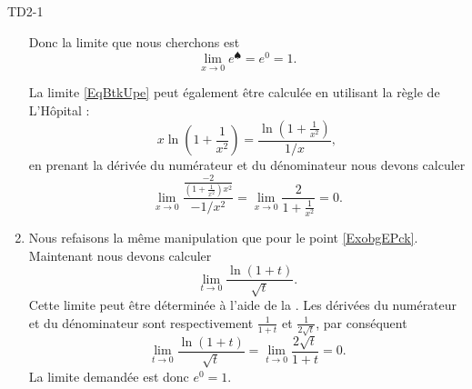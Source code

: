 \begin{corrige}{TD2-1}
\begin{enumerate}
			Donc la limite que nous cherchons est
			\begin{equation}
				\lim_{x\to 0} e^{\spadesuit}= e^{0}=1.
			\end{equation}

            La limite \eqref{EqBtkUpe} peut également être calculée en utilisant la règle de L'Hôpital :
            \begin{equation}
                x\ln\left( 1+\frac{1}{ x^2 } \right)=\frac{ \ln\left( 1+\frac{1}{ x^2 } \right) }{ 1/x },
            \end{equation}
            en prenant la dérivée du numérateur et du dénominateur nous devons calculer
            \begin{equation}
                \lim_{x\to 0} \frac{ \frac{ -2 }{ \left( 1+\frac{1}{ x^2 } \right)x^2 } }{ -1/x^2 }=\lim_{x\to 0} \frac{ 2 }{ 1+\frac{1}{ x^2 } }=0.
            \end{equation}

        \item
            Nous refaisons la même manipulation que pour le point \ref{ExobgEPck}. Maintenant nous devons calculer
            \begin{equation}
                \lim_{t\to 0} \frac{ \ln(1+t) }{ \sqrt{t} }.
            \end{equation}
            Cette limite peut être déterminée à l'aide de la . Les dérivées du numérateur et du dénominateur sont respectivement \( \frac{1}{ 1+t }\) et \( \frac{1}{ 2\sqrt{t} }\), par conséquent
            \begin{equation}
                \lim_{t\to 0} \frac{ \ln(1+t) }{ \sqrt{t} }=\lim_{t\to 0} \frac{ 2\sqrt{t} }{ 1+t }=0.
            \end{equation}
            La limite demandée est donc \(  e^{0}=1\).
			
	\end{enumerate}

\end{corrige}
